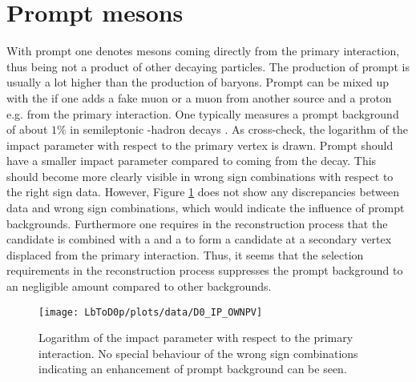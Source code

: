 \section{Prompt \Dz mesons}
With prompt \Dz one denotes \Dz mesons coming directly from the primary \proton\proton interaction, thus being not a product of other decaying particles.
The production of prompt \Dz is usually a lot higher than the production of \Lb baryons. 
Prompt \Dz can be mixed up with the \LbToDpmunuX if one adds a fake muon or a muon from another source and a proton e.g. from the primary interaction.
One typically measures a prompt \Dz background of about $1\%$ in semileptonic \bquark-hadron decays \cite{asld_LHCb}.
As cross-check, the logarithm of the \Dz impact parameter with respect to the primary vertex is drawn.
Prompt \Dz should have a smaller impact parameter compared to \Dz coming from the \Lb decay.
This should become more clearly visible in wrong sign combinations with respect to the right sign data.
However, Figure \ref{fig:plot_D0_IP} does not show any discrepancies between data and wrong sign combinations, which would indicate the influence of prompt \Dz backgrounds.
Furthermore one requires in the reconstruction process that the \Dz candidate is combined with a \mun and a \proton to form a \Lb candidate at a secondary vertex displaced from the primary interaction.
Thus, it seems that the selection requirements in the reconstruction process suppresses the prompt \Dz background to an negligible amount compared to other backgrounds. 
\begin{figure}[ptb]
	\centering
	\texttt{[image: LbToD0p/plots/data/D0\_IP\_OWNPV]}
	\caption{Logarithm of the \Dz impact parameter with respect to the primary \proton\proton interaction. No special behaviour of the wrong sign combinations indicating an enhancement of prompt \Dz background can be seen.}
	\label{fig:plot_D0_IP}
\end{figure}

